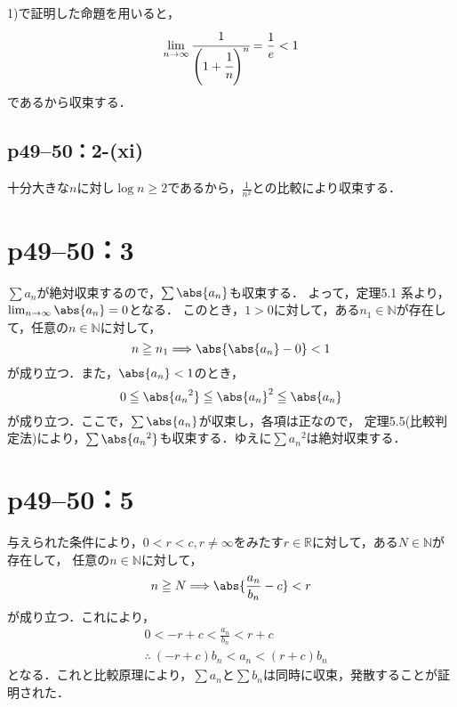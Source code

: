 
\begin{tanswer}
    1)で証明した命題を用いると，
    \[
        \lim _{n \to \infty} \cfrac{1}{\Bigg(1+\cfrac{1}{n}\Bigg)^n} = \frac{1}{e} < 1
    \]
    であるから収束する．
\end{tanswer}


\subsection*{p49--50：2-(xi)}


\begin{tanswer}
    十分大きな$n$に対し$\log n \geq 2$であるから，$\frac{1}{n^2}$との比較により収束する．
\end{tanswer}

\newpage

\section*{p49--50：3}

\begin{tproof}
    $\sum a_n $が絶対収束するので，$\sum \abs{a_n}$も収束する．
    よって，定理5.1 系より，$\lim_{n \to \infty} \abs{a_n} =0$となる．
    このとき，$1>0$に対して，ある$n_1 \in \mathbb{N}$が存在して，任意の$n \in \mathbb{N}$に対して，
    \[
        n \ge n_1 \Longrightarrow \abs{\abs{a_n} -0}<1
    \]
    が成り立つ．また，$\abs{a_n}<1$のとき，
    \[
        0 \le \abs{{a_n}^2} \le {\abs{a_n}}^2 \le \abs{a_n}
    \]
    が成り立つ．ここで，$\sum \abs{a_n}$が収束し，各項は正なので， 定理5.5(比較判定法)により，$\sum \abs{{a_n}^2}$も収束する．ゆえに$\sum {a_n}^2$は絶対収束する．
\end{tproof}


\section*{p49--50：5}

\begin{tproof}
    与えられた条件により，$0 <r <c , r \ne \infty $をみたす$r \in \mathbb{R}$に対して，ある$N \in \mathbb{N}$が存在して，
    任意の$n \in \mathbb{N}$に対して，
    \[
        n \ge N \Longrightarrow \abs{\frac{a_n}{b_n}-c}<r
    \]
    が成り立つ．これにより，
    \begin{align*}
         & 0<-r +c < \frac{a_n}{b_n} < r+c            \\
         & \therefore ~  (-r+c) b_n < a_n < (r+c) b_n
    \end{align*}
    となる．これと比較原理により，$\sum a_n$と$\sum b_n$は同時に収束，発散することが証明された．
\end{tproof}

